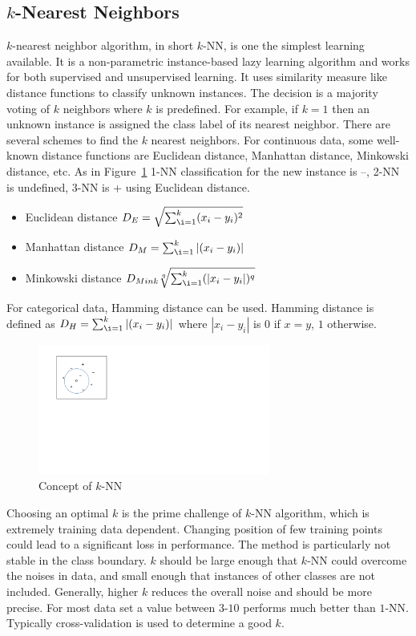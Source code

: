 \begin{appendices}
\subsection*{$k$-Nearest Neighbors}
$k$-nearest neighbor algorithm, in short $k$-NN, is one the simplest learning available. It is a non-parametric instance-based lazy learning algorithm and works for both supervised and unsupervised learning. It uses similarity measure like distance functions to classify unknown instances. The decision is a majority voting of  $k$ neighbors where $k$ is predefined. For example, if $k= 1$ then an unknown instance is assigned the class label of its nearest neighbor. There are several schemes to find the $k$ nearest neighbors. For continuous data, some well-known distance functions are Euclidean distance, Manhattan distance, Minkowski distance, etc.  As in Figure~\ref{fig:bg:knn} 1-NN classification for the new instance is {--}, 2-NN is undefined, 3-NN is {+} using Euclidean distance.
\begin{itemize}
    \item Euclidean distance $D_E = \sqrt{\sum_{\i =1 }^{k} (x_i - y_i)^2}$
    \item Manhattan distance $D_M = \sum_{\i =1 }^{k} |(x_i - y_i)|$
    \item Minkowski distance $D_{Mink}\sqrt[q]{\sum_{\i =1 }^{k} (|x_i - y_i|)^q}$
\end{itemize}
For categorical data, Hamming distance can be used. Hamming distance is defined as $D_H = \sum_{\i =1 }^{k} |(x_i - y_i)|$ where $|x_i - y_i|$ is $0$ if $x=y$, $1$ otherwise.

\begin{figure}[htbp]
\begin{center}
    \includegraphics[width=3.0in]{figs/knn.pdf}
    \caption{Concept of $k$-NN}
    \label{fig:bg:knn}
\end{center}
\end{figure}

Choosing an optimal $k$ is the prime challenge of $k$-NN algorithm, which is extremely training data dependent. Changing position of few training points could lead to a significant loss in performance. The method is particularly not stable in the class boundary. $k$ should be large enough that $k$-NN could overcome the noises in data, and small enough that instances of other classes are not included. Generally, higher $k$ reduces the overall noise and should be more precise. For most data set a value between $3$-$10$ performs much better than $1$-NN. Typically cross-validation is used to determine a good $k$. 


\end{appendices}

